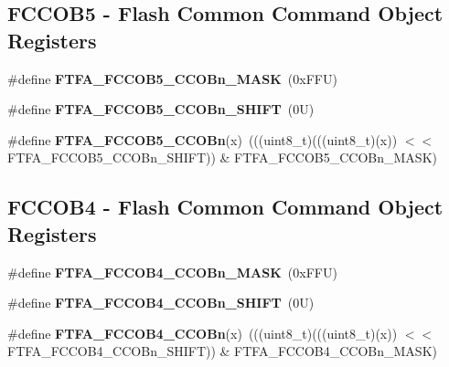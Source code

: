 \subsection*{F\+C\+C\+O\+B5 -\/ Flash Common Command Object Registers}
\begin{DoxyCompactItemize}
\item 
\mbox{\label{group___f_t_f_a___register___masks_ga6112d953d0c0527ada279726c9b0c5a3}} 
\#define {\bfseries F\+T\+F\+A\+\_\+\+F\+C\+C\+O\+B5\+\_\+\+C\+C\+O\+Bn\+\_\+\+M\+A\+SK}~(0x\+F\+F\+U)
\item 
\mbox{\label{group___f_t_f_a___register___masks_ga632fbfd380fcb5f46e4388b4edb490b2}} 
\#define {\bfseries F\+T\+F\+A\+\_\+\+F\+C\+C\+O\+B5\+\_\+\+C\+C\+O\+Bn\+\_\+\+S\+H\+I\+FT}~(0\+U)
\item 
\mbox{\label{group___f_t_f_a___register___masks_ga3eb812983637d422754d6c71bc37636f}} 
\#define {\bfseries F\+T\+F\+A\+\_\+\+F\+C\+C\+O\+B5\+\_\+\+C\+C\+O\+Bn}(x)~(((uint8\+\_\+t)(((uint8\+\_\+t)(x)) $<$$<$ F\+T\+F\+A\+\_\+\+F\+C\+C\+O\+B5\+\_\+\+C\+C\+O\+Bn\+\_\+\+S\+H\+I\+FT)) \& F\+T\+F\+A\+\_\+\+F\+C\+C\+O\+B5\+\_\+\+C\+C\+O\+Bn\+\_\+\+M\+A\+SK)
\end{DoxyCompactItemize}
\subsection*{F\+C\+C\+O\+B4 -\/ Flash Common Command Object Registers}
\begin{DoxyCompactItemize}
\item 
\mbox{\label{group___f_t_f_a___register___masks_ga42b1625323567bb015cf90601b468433}} 
\#define {\bfseries F\+T\+F\+A\+\_\+\+F\+C\+C\+O\+B4\+\_\+\+C\+C\+O\+Bn\+\_\+\+M\+A\+SK}~(0x\+F\+F\+U)
\item 
\mbox{\label{group___f_t_f_a___register___masks_ga22245895591851bc7a547b2fe5464b63}} 
\#define {\bfseries F\+T\+F\+A\+\_\+\+F\+C\+C\+O\+B4\+\_\+\+C\+C\+O\+Bn\+\_\+\+S\+H\+I\+FT}~(0\+U)
\item 
\mbox{\label{group___f_t_f_a___register___masks_ga3392c0d338eb61be4e67f0b4a720b06e}} 
\#define {\bfseries F\+T\+F\+A\+\_\+\+F\+C\+C\+O\+B4\+\_\+\+C\+C\+O\+Bn}(x)~(((uint8\+\_\+t)(((uint8\+\_\+t)(x)) $<$$<$ F\+T\+F\+A\+\_\+\+F\+C\+C\+O\+B4\+\_\+\+C\+C\+O\+Bn\+\_\+\+S\+H\+I\+FT)) \& F\+T\+F\+A\+\_\+\+F\+C\+C\+O\+B4\+\_\+\+C\+C\+O\+Bn\+\_\+\+M\+A\+SK)
\end{DoxyCompactItemize}
